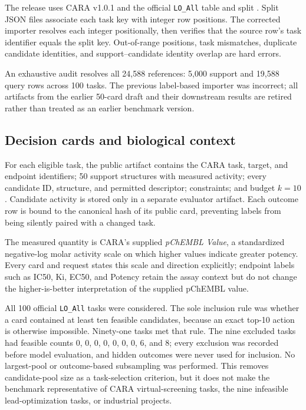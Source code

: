 \documentclass[10pt,a4paper]{article}
\begin{document}
The release uses CARA v1.0.1 and the official \texttt{LO\_All} table and split
\cite{cara2024dataset}.
Split JSON files associate each task key with integer row positions. The
corrected importer resolves each integer positionally, then verifies that the
source row's task identifier equals the split key. Out-of-range positions,
task mismatches, duplicate candidate identities, and support--candidate
identity overlap are hard errors.

An exhaustive audit resolves all 24,588 references: 5,000 support and 19,588
query rows across 100 tasks. The previous label-based importer was incorrect;
all artifacts from the earlier 50-card draft and their downstream results are
retired rather than treated as an earlier benchmark version.

\subsection{Decision cards and biological context}

For each eligible task, the public artifact contains the CARA task, target, and
endpoint identifiers; 50 support structures with measured activity; every
candidate ID, structure, and permitted descriptor; constraints; and budget
$k=10$. Candidate activity is stored only in a separate evaluator artifact.
Each outcome row is bound to the canonical hash of its public card, preventing
labels from being silently paired with a changed task.

The measured quantity is CARA's supplied \emph{pChEMBL Value}, a standardized
negative-log molar activity scale on which higher values indicate greater
potency. Every card and request states this scale and direction explicitly;
endpoint labels such as IC50, Ki, EC50, and Potency retain the assay context but
do not change the higher-is-better interpretation of the supplied pChEMBL value.

All 100 official \texttt{LO\_All} tasks were considered. The sole inclusion
rule was whether a card contained at least ten feasible candidates, because an
exact top-10 action is otherwise impossible. Ninety-one tasks met that rule.
The nine excluded tasks had feasible counts 0, 0, 0, 0, 0, 0, 0, 6, and 8;
every exclusion was recorded before model evaluation, and hidden outcomes were
never used for inclusion. No largest-pool or outcome-based subsampling was
performed. This removes candidate-pool size as a task-selection criterion, but
it does not make the benchmark representative of CARA virtual-screening tasks,
the nine infeasible lead-optimization tasks, or industrial projects.
\end{document}
